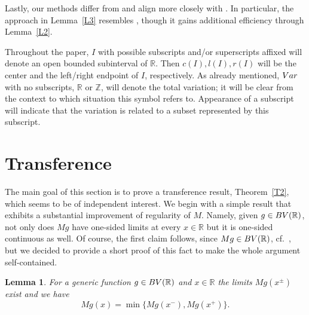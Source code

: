 \documentclass[leqno,11pt]{amsart}
\numberwithin{equation}{section}
\numberwithin{theorem}{section}
\newtheorem{lemma}[theorem]{Lemma}
\newcommand{\RR}{\mathbb{R}}
\newcommand{\ZZ}{\mathbb{Z}}
\newcommand{\Var}{{\rm Var}}
\newcommand{\BV}{{\rm BV}}
\begin{document}
	Lastly, our methods differ from \cite{BW} and align more closely with \cite{M2017}. In particular, the approach in Lemma~\ref{L3} resembles \cite[Section~2]{M2017}, though it gains additional efficiency through Lemma~\ref{L2}.        
	
	Throughout the paper, $I$ with possible subscripts and/or superscripts affixed will denote an open bounded subinterval of $\RR$. Then $c(I), l(I), r(I)$ will be the center and the left/right endpoint of  $I$, respectively.
	As already mentioned, $\Var$ with no subscripts, $\RR$ or $\ZZ$, will denote the total variation; it will be clear from the context to which situation this symbol refers to. Appearance of a subscript will indicate that the variation is related to a subset represented by this subscript.

	\section{Transference} \label{S2}
	
	The main goal of this section is to prove a transference result, Theorem~\ref{T2}, which seems to be of independent interest.  We begin with a simple result that exhibits a substantial improvement of regularity of $M$. Namely, given $g \in \BV(\RR)$, not only does $Mg$ have one-sided limits at every $x\in\RR$ but it is one-sided continuous as well. Of course, the first claim follows, since $Mg \in \BV(\RR)$, cf.~\cite{Kurka2010}, but we decided to provide a short proof of this fact to make the whole argument self-contained.
	
	\begin{lemma} \label{limits}
	For a generic function $g \in \BV(\RR)$ and $x \in \RR$ the limits $Mg(x^\pm)$ exist and we have
	\begin{equation} \label{eq:T2}
	Mg(x) = \min \{ Mg(x^-), Mg(x^+) \}.
	\end{equation}	
	\end{lemma}
	
\end{document}
